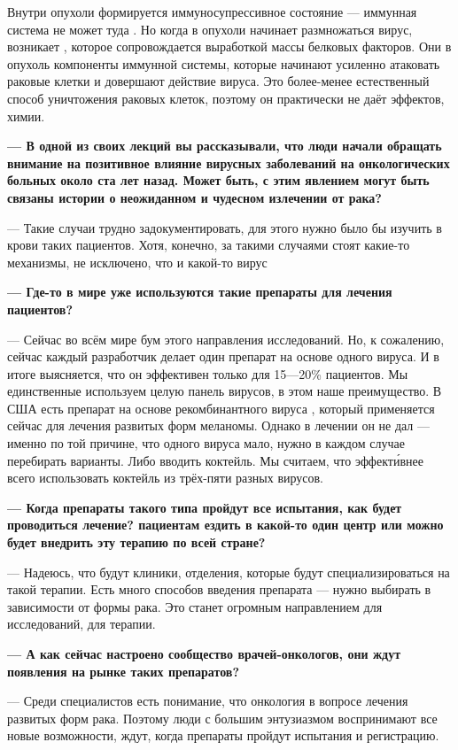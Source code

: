 Внутри опухоли формируется иммуносупрессивное состояние --- иммунная система не может туда . Но когда в опухоли начинает размножаться вирус, возникает , которое сопровождается выработкой массы белковых факторов. Они  в опухоль компоненты иммунной системы, которые начинают усиленно атаковать раковые клетки и довершают действие вируса. Это более-менее естественный способ уничтожения раковых клеток, поэтому он практически не даёт  эффектов,  химии.

{\bf --- В одной из своих лекций вы рассказывали, что люди начали обращать внимание на позитивное влияние вирусных заболеваний на онкологических больных около ста лет назад. Может быть, с этим явлением могут быть  связаны истории о неожиданном и чудесном излечении от рака?}

--- Такие случаи трудно задокументировать, для этого нужно было бы изучить  в крови таких пациентов. Хотя, конечно, за такими случаями стоят какие-то механизмы, не исключено, что и какой-то вирус

{\bf --- Где-то в мире уже используются такие препараты для лечения пациентов?}

--- Сейчас во всём мире  бум этого направления исследований. Но, к сожалению, сейчас каждый разработчик делает один препарат на основе одного вируса. И в итоге выясняется, что он эффективен только для 15---20\% пациентов. Мы единственные используем целую панель вирусов, в этом наше преимущество. В США есть препарат на основе рекомбинантного вируса , который применяется сейчас для лечения развитых форм меланомы. Однако  в лечении он не дал --- именно по той причине, что одного вируса мало, нужно в каждом случае перебирать варианты. Либо вводить коктейль. Мы считаем, что эффект\'{и}внее всего использовать коктейль из трёх-пяти разных вирусов.

{\bf --- Когда препараты такого типа пройдут все испытания, как будет проводиться лечение?  пациентам ездить в какой-то один центр или можно будет внедрить эту терапию по всей стране?}

--- Надеюсь, что будут клиники, отделения, которые будут специализироваться на такой терапии. Есть много способов введения препарата --- нужно выбирать в зависимости от формы рака. Это станет огромным направлением для исследований, для терапии.

{\bf --- А как сейчас настроено сообщество врачей-онкологов, они ждут появления на рынке таких препаратов?}

--- Среди специалистов есть понимание, что онкология  в вопросе лечения развитых форм рака. Поэтому люди с большим энтузиазмом воспринимают все новые возможности, ждут, когда препараты пройдут испытания и регистрацию.


